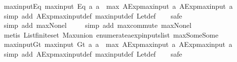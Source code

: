 \begin{isabellebody}
\endisatagproof
{\isafoldproof}%
%
\isadelimproof
\isanewline
%
\endisadelimproof
\isanewline
{}\isamarkupfalse%
\ max{\isacharunderscore}input{\isacharunderscore}Eq{\isacharcolon}\ {\isachardoublequoteopen}max{\isacharunderscore}input\ {\isacharparenleft}Eq\ a{}\ a{}{\isacharparenright}\ {\isacharequal}\ max\ {\isacharparenleft}AExp{\isachardot}max{\isacharunderscore}input\ a{}{\isacharparenright}\ {\isacharparenleft}AExp{\isachardot}max{\isacharunderscore}input\ a{}{\isacharparenright}{\isachardoublequoteclose}\isanewline
%
\isadelimproof
\ \ %
\endisadelimproof
%
\isatagproof
{}\isamarkupfalse%
\ {\isacharparenleft}simp\ add{\isacharcolon}\ AExp{\isachardot}max{\isacharunderscore}input{\isacharunderscore}def\ max{\isacharunderscore}input{\isacharunderscore}def\ Let{\isacharunderscore}def{\isacharparenright}\isanewline
\ \ \isamarkupfalse%
\ safe\isanewline
\ \ \ \ \isamarkupfalse%
\ {\isacharparenleft}simp\ add{\isacharcolon}\ max{\isacharunderscore}None{\isacharunderscore}l{\isacharparenright}\isanewline
\ \ \ \isamarkupfalse%
\ {\isacharparenleft}simp\ add{\isacharcolon}\ max{\isachardot}commute\ max{\isacharunderscore}None{\isacharunderscore}l{\isacharparenright}\isanewline
\ \ \isamarkupfalse%
\ {\isacharparenleft}metis\ List{\isachardot}finite{\isacharunderscore}set\ Max{\isachardot}union\ enumerate{\isacharunderscore}aexp{\isacharunderscore}inputs{\isacharunderscore}list\ max{\isacharunderscore}Some{\isacharunderscore}Some{\isacharparenright}%
\endisatagproof
{\isafoldproof}%
%
\isadelimproof
\isanewline
%
\endisadelimproof
\isanewline
{}\isamarkupfalse%
\ max{\isacharunderscore}input{\isacharunderscore}Gt{\isacharcolon}\ {\isachardoublequoteopen}max{\isacharunderscore}input\ {\isacharparenleft}Gt\ a{}\ a{}{\isacharparenright}\ {\isacharequal}\ max\ {\isacharparenleft}AExp{\isachardot}max{\isacharunderscore}input\ a{}{\isacharparenright}\ {\isacharparenleft}AExp{\isachardot}max{\isacharunderscore}input\ a{}{\isacharparenright}{\isachardoublequoteclose}\isanewline
%
\isadelimproof
\ \ %
\endisadelimproof
%
\isatagproof
{}\isamarkupfalse%
\ {\isacharparenleft}simp\ add{\isacharcolon}\ AExp{\isachardot}max{\isacharunderscore}input{\isacharunderscore}def\ max{\isacharunderscore}input{\isacharunderscore}def\ Let{\isacharunderscore}def{\isacharparenright}\isanewline
\ \ \isamarkupfalse%
\ safe\isanewline
\ \ \ \ \isamarkupfalse%

\end{isabellebody}
